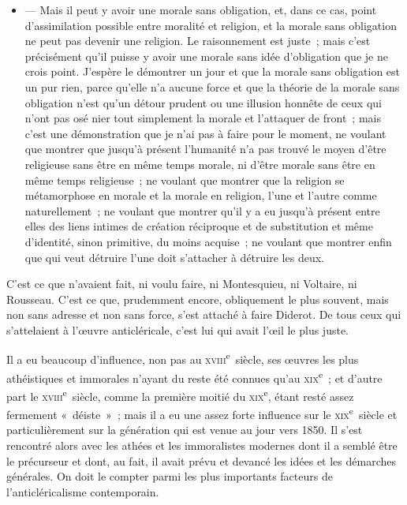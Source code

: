 \documentclass[french,twoside]{book} %
\begin{document}
\begin{itemize}[itemsep=0pt,]
\item  — Mais il peut y avoir une morale sans obligation, et, dans ce cas, point d’assimilation possible entre moralité et religion, et la morale sans obligation ne peut pas devenir une religion. Le raisonnement est juste ; mais c’est précisément qu’il puisse y avoir une morale sans idée d’obligation que je ne crois point. J’espère le démontrer un jour et que la morale sans obligation est un pur rien, parce qu’elle n’a aucune force et que la théorie de la morale sans obligation n’est qu’un détour prudent ou une illusion honnête de ceux qui n’ont pas osé nier tout simplement la morale et l’attaquer de front ; mais c’est une démonstration que je n’ai pas à faire  pour le moment, ne voulant que montrer que jusqu’à présent l’humanité n’a pas trouvé le moyen d’être religieuse sans être en même temps morale, ni d’être morale sans être en même temps religieuse ; ne voulant que montrer que la religion se métamorphose en morale et la morale en religion, l’une et l’autre comme naturellement ; ne voulant que montrer qu’il y a eu jusqu’à présent entre elles des liens intimes de création réciproque et de substitution et même d’identité, sinon primitive, du moins acquise ; ne voulant que montrer enfin que qui veut détruire l’une doit s’attacher à détruire les deux.
\end{itemize}

\noindent C’est ce que n’avaient fait, ni voulu faire, ni Montesquieu, ni Voltaire, ni Rousseau. C’est ce que, prudemment encore, obliquement le plus souvent, mais non sans adresse et non sans force, s’est attaché à faire Diderot. De tous ceux qui s’attelaient à l’œuvre anticléricale, c’est lui qui avait l’œil le plus juste.\par
Il a eu beaucoup d’influence, non pas au \textsc{xviii}\textsuperscript{e} siècle, ses œuvres les plus athéistiques et immorales n’ayant du reste été connues qu’au \textsc{xix}\textsuperscript{e} ; et d’autre part le \textsc{xviii}\textsuperscript{e} siècle, comme la première moitié du \textsc{xix}\textsuperscript{e}, étant resté assez fermement « déiste » ; mais il a eu une assez forte influence sur le \textsc{xix}\textsuperscript{e} siècle et particulièrement sur  la génération qui est venue au jour vers 1850. Il s’est rencontré alors avec les athées et les immoralistes modernes dont il a semblé être le précurseur et dont, au fait, il avait prévu et devancé les idées et les démarches générales. On doit le compter parmi les plus importants facteurs de l’anticléricalisme contemporain.\par
\end{document}
